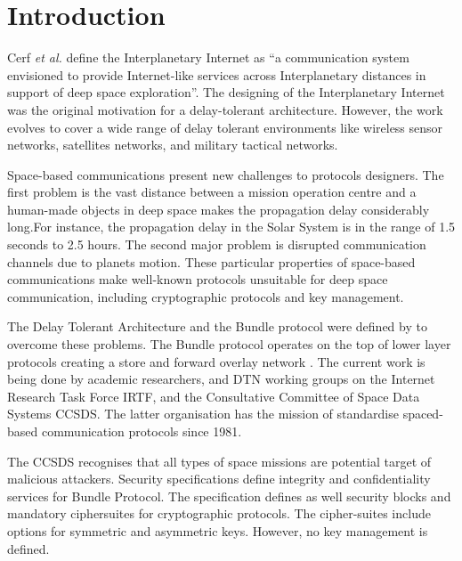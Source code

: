 \section{Introduction}

Cerf \textit{et al.} \cite{cerf2007delay} define the Interplanetary Internet as ``a communication system envisioned to provide Internet-like services across Interplanetary distances in support of deep space exploration''. The designing of the Interplanetary Internet was the original motivation for a delay-tolerant architecture. However, the work evolves to cover a wide range of delay tolerant environments like wireless sensor networks, satellites networks, and military tactical networks. 

Space-based communications present new challenges to protocols designers. The first problem is the vast distance between a mission operation centre and a human-made objects in deep space makes the propagation delay considerably long.For instance, the propagation delay in the Solar System is in the range of 1.5 seconds to  2.5 hours. The second major problem is disrupted communication channels due to planets motion. These particular properties of space-based communications make well-known protocols unsuitable for deep space communication, including cryptographic protocols and key management.  


The Delay Tolerant Architecture \cite{cerf2007delay} and the Bundle protocol \cite{scott2007bundle} were defined by to overcome these problems. The Bundle protocol operates on the top of lower layer protocols creating a store and forward overlay network \cite{ivancic2009security}. The current work is being done by academic researchers, and DTN working groups on the Internet Research Task Force IRTF, and the Consultative Committee of Space Data Systems CCSDS. The latter organisation has the mission of standardise spaced-based communication protocols since 1981.


The CCSDS recognises that all types of space missions are potential target of malicious attackers.  Security specifications \cite{ietf-dtn-bibect-00,ietf-dtn-bpsec-07,rfc6257} define integrity and confidentiality services for Bundle Protocol. The specification defines as well security blocks and mandatory ciphersuites for cryptographic protocols. The cipher-suites include options for symmetric and asymmetric keys. However, no key management is defined. 

